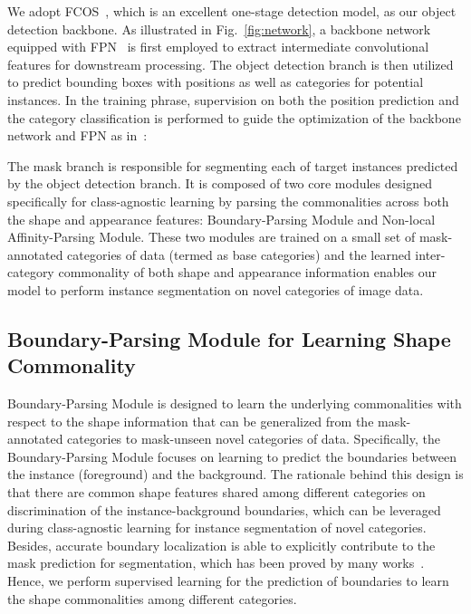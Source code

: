 \documentclass[runningheads]{llncs}
\begin{document}
We adopt FCOS~\cite{tian2019fcos}, which is an excellent one-stage detection model, as our object detection backbone. As illustrated in Fig.~\ref{fig:network}, a backbone network equipped with FPN~\cite{lin2017feature} is first employed to extract intermediate convolutional features for downstream processing. The object detection branch is then utilized to predict bounding boxes with positions as well as categories for potential instances. In the training phrase, supervision on both the position prediction and the category classification is performed to guide the optimization of the backbone network and FPN as in~\cite{tian2019fcos}:
\begin{small}
\vspace{-2mm}

\end{small}
\vspace{-0.25in}

The mask branch is responsible for segmenting each of target instances predicted by the object detection branch. It is composed of two core modules designed specifically for class-agnostic learning by parsing the commonalities across both the shape and appearance features: Boundary-Parsing Module and Non-local Affinity-Parsing Module. These two modules are trained on a small set of mask-annotated categories of data (termed as base categories) and the learned inter-category commonality of both shape and appearance information enables our model to perform instance segmentation on novel categories of image data.  

\vspace{-2mm}
\subsection{Boundary-Parsing Module for Learning Shape Commonality}
\vspace{-1mm}
Boundary-Parsing Module is designed to learn the underlying commonalities with respect to the shape information that can be generalized from the mask-annotated categories to mask-unseen novel categories of data. Specifically, the Boundary-Parsing Module focuses on learning to predict the boundaries between the instance (foreground) and the background. The rationale behind this design is that there are common shape features shared among different categories on discrimination of the instance-background boundaries, which can be leveraged during class-agnostic learning for instance segmentation of novel categories. Besides, accurate boundary localization is able to explicitly contribute to the mask prediction for segmentation, which has been proved by many works~\cite{arbelaez2009contours,arbelaez2010contour,bertasius2015high,chen2016semantic,ding2019boundary,luo2017non,qin2019basnet,wang2019salient,yu2018learning,zhao2019egnet}.
Hence, we perform supervised learning for the prediction of boundaries to learn the shape commonalities among different categories.  
\end{document}
